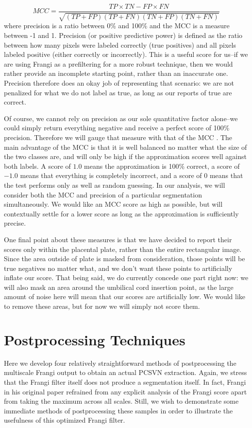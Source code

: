 \begin{equation} \label{eq:MCC}
MCC = \frac{TP\times TN - FP \times FN}{\sqrt{ (TP + FP)(TP+FN)(TN+FP)(TN+FN)}}
\end{equation}
\noindent where precision is a ratio between 0\% and 100\% and the MCC is a measure between -1 and 1. Precision (or positive predictive power) is defined as the ratio between how many pixels were labeled correctly (true positives) and all pixels labeled positive (either correctly or incorrectly). This is a useful score for us--if we are using Frangi as a prefiltering for a more robust technique, then we would rather provide an incomplete starting point, rather than an inaccurate one. Precision therefore does an okay job of representing that scenario: we are not penalized for what we do not label as true, as long as our reports of true are correct.

Of course, we cannot rely on precision as our sole quantitative factor alone--we could simply return everything negative and receive a perfect score of 100\% precision. Therefore we will gauge that measure with that of the MCC \autocite{mcc-original-paper}. The main advantage of the MCC is that it is well balanced no matter what the size of the two classes are, and will only be high if the approximation scores well against both labels. A score of $1.0$ means the approximation is 100\% correct, a score of $-1.0$ means that everything is completely incorrect, and a score of $0$ means that the test performs only as well as random guessing. In our analysis, we will consider both the MCC and precision of a particular segmentation simultaneously. We would like an MCC score as high as possible, but will contextually settle for a lower score as long as the approximation is sufficiently precise.

One final point about these measures is that we have decided to report their scores only within the placental plate, rather than the entire rectangular image. Since the area outside of plate is masked from consideration, those points will be true negatives no matter what, and we don't want these points to artificially inflate our score. That being said, we do currently concede one part right now: we will also mask an area around the umbilical cord insertion point, as the large amount of noise here will mean that our scores are artificially low. We would like to remove these areas, but for now we will simply not score them. 

\section{Postprocessing Techniques}
Here we develop four relatively straightforward methods of postprocessing the multiscale Frangi output to obtain an actual PCSVN extraction. Again, we stress that the Frangi filter itself does not produce a segmentation itself. In fact, Frangi in his original paper \autocite{frangi-paper} refrained from any explicit analysis of the Frangi score apart from taking the maximum across all scales. Still, we wish to demonstrate some immediate methods of postprocessing these samples in order to illustrate the usefulness of this optimized Frangi filter. 


